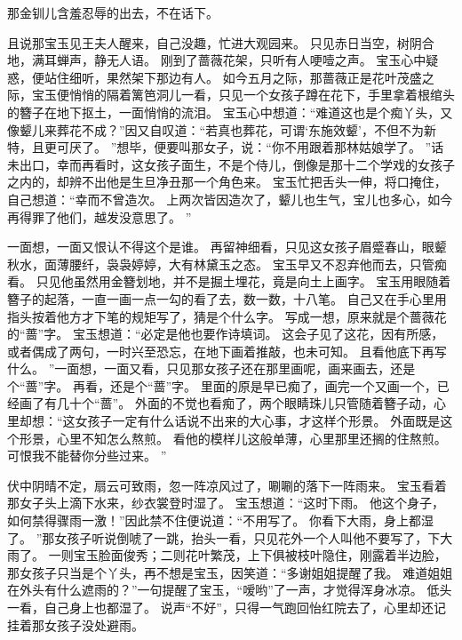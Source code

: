 那金钏儿含羞忍辱的出去，不在话下。
\par
且说那宝玉见王夫人醒来，自己没趣，忙进大观园来。
只见赤日当空，树阴合地，满耳蝉声，静无人语。
刚到了蔷薇花架，只听有人哽噎之声。
宝玉心中疑惑，便站住细听，果然架下那边有人。
如今五月之际，那蔷薇正是花叶茂盛之际，宝玉便悄悄的隔着篱笆洞儿一看，只见一个女孩子蹲在花下，手里拿着根绾头的簪子在地下抠土，一面悄悄的流泪。
宝玉心中想道：“难道这也是个痴丫头，又像颦儿来葬花不成？”因又自叹道：“若真也葬花，可谓‘东施效颦’，不但不为新特，且更可厌了。
”想毕，便要叫那女子，说：“你不用跟着那林姑娘学了。
”话未出口，幸而再看时，这女孩子面生，不是个侍儿，倒像是那十二个学戏的女孩子之内的，却辨不出他是生旦净丑那一个角色来。
宝玉忙把舌头一伸，将口掩住，自己想道：“幸而不曾造次。
上两次皆因造次了，颦儿也生气，宝儿也多心，如今再得罪了他们，越发没意思了。
”\par
一面想，一面又恨认不得这个是谁。
再留神细看，只见这女孩子眉蹙春山，眼颦秋水，面薄腰纤，袅袅婷婷，大有林黛玉之态。
宝玉早又不忍弃他而去，只管痴看。
只见他虽然用金簪划地，并不是掘土埋花，竟是向土上画字。
宝玉用眼随着簪子的起落，一直一画一点一勾的看了去，数一数，十八笔。
自己又在手心里用指头按着他方才下笔的规矩写了，猜是个什么字。
写成一想，原来就是个蔷薇花的“蔷”字。
宝玉想道：“必定是他也要作诗填词。
这会子见了这花，因有所感，或者偶成了两句，一时兴至恐忘，在地下画着推敲，也未可知。
且看他底下再写什么。
”一面想，一面又看，只见那女孩子还在那里画呢，画来画去，还是个“蔷”字。
再看，还是个“蔷”字。
里面的原是早已痴了，画完一个又画一个，已经画了有几十个“蔷”。
外面的不觉也看痴了，两个眼睛珠儿只管随着簪子动，心里却想：“这女孩子一定有什么话说不出来的大心事，才这样个形景。
外面既是这个形景，心里不知怎么熬煎。
看他的模样儿这般单薄，心里那里还搁的住熬煎。
可恨我不能替你分些过来。
”\par
伏中阴晴不定，扇云可致雨，忽一阵凉风过了，唰唰的落下一阵雨来。
宝玉看着那女子头上滴下水来，纱衣裳登时湿了。
宝玉想道：“这时下雨。
他这个身子，如何禁得骤雨一激！”因此禁不住便说道：“不用写了。
你看下大雨，身上都湿了。
”那女孩子听说倒唬了一跳，抬头一看，只见花外一个人叫他不要写了，下大雨了。
一则宝玉脸面俊秀；二则花叶繁茂，上下俱被枝叶隐住，刚露着半边脸，那女孩子只当是个丫头，再不想是宝玉，因笑道：“多谢姐姐提醒了我。
难道姐姐在外头有什么遮雨的？”一句提醒了宝玉，“嗳哟”了一声，才觉得浑身冰凉。
低头一看，自己身上也都湿了。
说声“不好”，只得一气跑回怡红院去了，心里却还记挂着那女孩子没处避雨。

